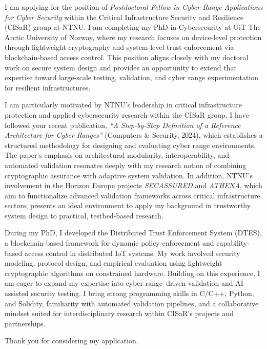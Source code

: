 I am applying for the position of \textit{Postdoctoral Fellow in Cyber Range Applications for Cyber Security} within the Critical Infrastructure Security and Resilience (CISaR) group at NTNU. I am completing my PhD in Cybersecurity at UiT The Arctic University of Norway, where my research focuses on device-level protection through lightweight cryptography and system-level trust enforcement via blockchain-based access control. This position aligns closely with my doctoral work on secure system design and provides an opportunity to extend that expertise toward large-scale testing, validation, and cyber range experimentation for resilient infrastructures.

I am particularly motivated by NTNU’s leadership in critical infrastructure protection and applied cybersecurity research within the CISaR group. I have followed your recent publication, \textit{“A Step-by-Step Definition of a Reference Architecture for Cyber Ranges”} (Computers \& Security, 2024), which establishes a structured methodology for designing and evaluating cyber range environments. The paper’s emphasis on architectural modularity, interoperability, and automated validation resonates deeply with my research notion of combining cryptographic assurance with adaptive system validation. In addition, NTNU’s involvement in the Horizon Europe projects \textit{SECASSURED} and \textit{ATHENA}, which aim to functionalize advanced validation frameworks across critical infrastructure sectors, presents an ideal environment to apply my background in trustworthy system design to practical, testbed-based research.

During my PhD, I developed the Distributed Trust Enforcement System (DTES), a blockchain-based framework for dynamic policy enforcement and capability-based access control in distributed IoT systems. My work involved security modeling, protocol design, and empirical evaluation using lightweight cryptographic algorithms on constrained hardware. Building on this experience, I am eager to expand my expertise into cyber range–driven validation and AI-assisted security testing. I bring strong programming skills in C/C++, Python, and Solidity, familiarity with automated validation pipelines, and a collaborative mindset suited for interdisciplinary research within CISaR’s projects and partnerships.

Thank you for considering my application.